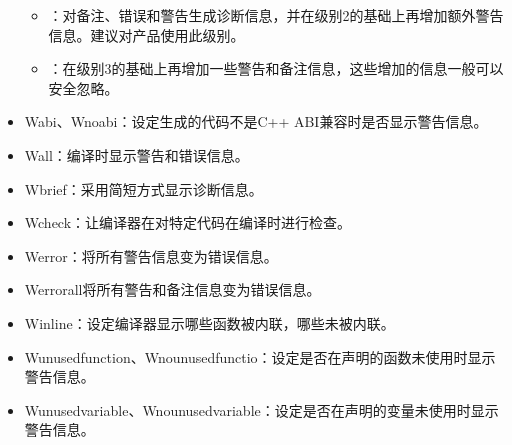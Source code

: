 \documentclass[a4paper,12pt,english]{sphinxmanual}
\begin{document}
\begin{itemize}
\begin{itemize}
\item {} 
：对备注、错误和警告生成诊断信息，并在级别2的基础上再增加额外警告信息。建议对产品使用此级别。

\item {} 
：在级别3的基础上再增加一些警告和备注信息，这些增加的信息一般可以安全忽略。

\end{itemize}

\item {} 
\sphinxAtStartPar
\sphinxhyphen{}Wabi、\sphinxhyphen{}Wno\sphinxhyphen{}abi：设定生成的代码不是C++ ABI兼容时是否显示警告信息。

\item {} 
\sphinxAtStartPar
\sphinxhyphen{}Wall：编译时显示警告和错误信息。

\item {} 
\sphinxAtStartPar
\sphinxhyphen{}Wbrief：采用简短方式显示诊断信息。

\item {} 
\sphinxAtStartPar
\sphinxhyphen{}Wcheck：让编译器在对特定代码在编译时进行检查。

\item {} 
\sphinxAtStartPar
\sphinxhyphen{}Werror：将所有警告信息变为错误信息。

\item {} 
\sphinxAtStartPar
\sphinxhyphen{}Werror\sphinxhyphen{}all将所有警告和备注信息变为错误信息。

\item {} 
\sphinxAtStartPar
\sphinxhyphen{}Winline：设定编译器显示哪些函数被内联，哪些未被内联。

\item {} 
\sphinxAtStartPar
\sphinxhyphen{}Wunused\sphinxhyphen{}function、\sphinxhyphen{}Wno\sphinxhyphen{}unused\sphinxhyphen{}functio：设定是否在声明的函数未使用时显示警告信息。

\item {} 
\sphinxAtStartPar
\sphinxhyphen{}Wunused\sphinxhyphen{}variable、\sphinxhyphen{}Wno\sphinxhyphen{}unused\sphinxhyphen{}variable：设定是否在声明的变量未使用时显示警告信息。

\end{itemize}
\end{document}
